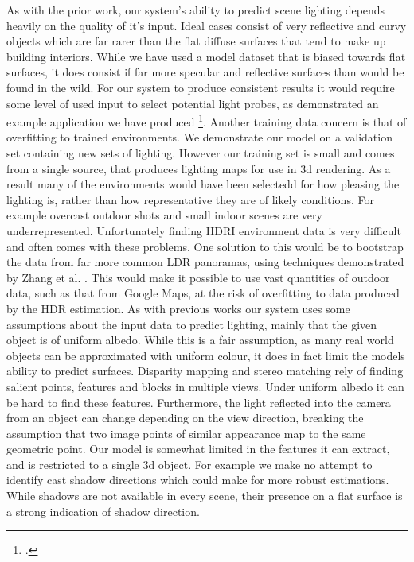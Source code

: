\documentclass[ %
                    author={Gavin Parker},
                supervisor={Dr. Neill Campbell},
                    degree={MEng},
                     title={Deep Siamese Networks for Illumination Estimation from Stereo Images},
                  subtitle={},
                      type={research},
                      year={2018} ]{dissertation}
\begin{document}
As with the prior work, our system's ability to predict scene lighting depends heavily on the quality of it's input. Ideal cases consist of very reflective and curvy objects which are far rarer than the flat diffuse surfaces that tend to make up building interiors. While we have used a model dataset that is biased towards flat surfaces, it does consist if far more specular and reflective surfaces than would be found in the wild. For our system to produce consistent results it would require some level of used input to select potential light probes, as demonstrated an example application we have produced \footcite{Reference our app}. Another training data concern is that of overfitting to trained environments. We demonstrate our model on a validation set containing new sets of lighting. However our training set is small and comes from a single source, that produces lighting maps for use in 3d rendering. As a result many of the environments would have been selectedd for how pleasing the lighting is, rather than how representative they are of likely conditions. For example overcast outdoor shots and small indoor scenes are very underrepresented. Unfortunately finding HDRI environment data is very difficult and often comes with these problems. One solution to this would be to bootstrap the data from far more common LDR panoramas, using techniques demonstrated by Zhang et al. \cite{zhang2017learning}. This would make it possible to use vast quantities of outdoor data, such as that from Google Maps, at the risk of overfitting to data produced by the HDR estimation.
\newline
As with previous works our system uses some assumptions about the input data to predict lighting, mainly that the given object is of uniform albedo. While this is a fair assumption, as many real world objects can be approximated with uniform colour, it does in fact limit the models ability to predict surfaces. Disparity mapping and stereo matching rely of finding salient points, features and blocks in multiple views. Under uniform albedo it can be hard to find these features. Furthermore, the light reflected into the camera from an object can change depending on the view direction, breaking the assumption that two image points of similar appearance map to the same geometric point.
\newline
Our model is somewhat limited in the features it can extract, and is restricted to a single 3d object. For example we make no attempt to identify cast shadow directions which could make for more robust estimations. While shadows are not available in every scene, their presence on a flat surface is a strong indication of shadow direction.
\end{document}
